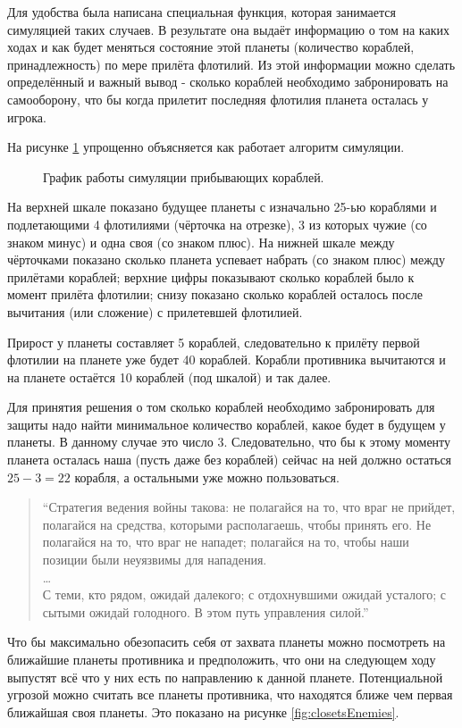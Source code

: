 \documentclass[12pt]{report}
\begin{document}
Для удобства была написана специальная функция, которая занимается симуляцией таких случаев. В результате она выдаёт информацию о том на каких ходах и как будет меняться состояние этой планеты (количество кораблей, принадлежность) по мере прилёта флотилий. Из этой информации можно сделать определённый и важный вывод - сколько кораблей необходимо забронировать на самооборону, что бы когда прилетит последняя флотилия планета осталась у игрока.

На рисунке \ref{fig:simulation} упрощенно объясняется как работает алгоритм симуляции. 

\begin{figure}[h]
	\centering
	
	\caption{График работы симуляции прибывающих кораблей.}
	\label{fig:simulation}
\end{figure}

На верхней шкале показано будущее планеты с изначально 25-ью кораблями и подлетающими 4 флотилиями (чёрточка на отрезке), 3 из которых чужие (со знаком минус) и одна своя (со знаком плюс). На нижней шкале между чёрточками показано сколько планета успевает набрать (со знаком плюс) между прилётами кораблей; верхние цифры показывают сколько кораблей было к момент прилёта флотилии; снизу показано сколько кораблей осталось после вычитания (или сложение) с прилетевшей флотилией.

Прирост у планеты составляет 5 кораблей, следовательно к прилёту первой флотилии на планете уже будет 40 кораблей.  Корабли противника вычитаются и на планете остаётся 10 кораблей (под шкалой) и так далее.

Для принятия решения о том сколько кораблей необходимо забронировать для защиты надо найти минимальное количество кораблей, какое будет в будущем у планеты. В данному случае это число 3. Следовательно, что бы к этому моменту планета осталась наша (пусть даже без кораблей) сейчас на ней должно остаться $25 - 3 = 22$ корабля, а остальными уже можно пользоваться.
\begin{quote}
``Стратегия ведения войны такова: не полагайся на то, что враг не прийдет, полагайся на средства, которыми располагаешь, чтобы принять его. Не полагайся на то, что враг не нападет; полагайся на то, чтобы наши позиции были неуязвимы для нападения. \\
\ldots\\
С теми, кто рядом, ожидай далекого; с отдохнувшими ожидай
усталого; с сытыми ожидай голодного. В этом путь управления силой.'' \\ \citep{tzu1971art}
\end{quote}
Что бы максимально обезопасить себя от захвата планеты можно посмотреть на ближайшие планеты противника и предположить, что они на следующем ходу выпустят всё что у них есть по направлению к данной планете. Потенциальной угрозой можно считать все планеты противника, что находятся ближе чем первая ближайшая своя планеты. Это показано на рисунке \ref{fig:closetsEnemies}.
\end{document}
